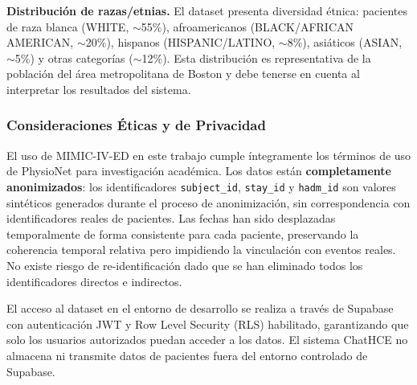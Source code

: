 \textbf{Distribución de razas/etnias.} El dataset presenta diversidad étnica: pacientes de raza blanca (WHITE, $\sim$55\%), afroamericanos (BLACK/AFRICAN AMERICAN, $\sim$20\%), hispanos (HISPANIC/LATINO, $\sim$8\%), asiáticos (ASIAN, $\sim$5\%) y otras categorías ($\sim$12\%). Esta distribución es representativa de la población del área metropolitana de Boston y debe tenerse en cuenta al interpretar los resultados del sistema.

\subsubsection{Consideraciones Éticas y de Privacidad}

El uso de MIMIC-IV-ED en este trabajo cumple íntegramente los términos de uso de PhysioNet para investigación académica. Los datos están \textbf{completamente anonimizados}: los identificadores \texttt{subject\_id}, \texttt{stay\_id} y \texttt{hadm\_id} son valores sintéticos generados durante el proceso de anonimización, sin correspondencia con identificadores reales de pacientes. Las fechas han sido desplazadas temporalmente de forma consistente para cada paciente, preservando la coherencia temporal relativa pero impidiendo la vinculación con eventos reales. No existe riesgo de re-identificación dado que se han eliminado todos los identificadores directos e indirectos.

El acceso al dataset en el entorno de desarrollo se realiza a través de Supabase con autenticación JWT y Row Level Security (RLS) habilitado, garantizando que solo los usuarios autorizados puedan acceder a los datos. El sistema ChatHCE no almacena ni transmite datos de pacientes fuera del entorno controlado de Supabase.

